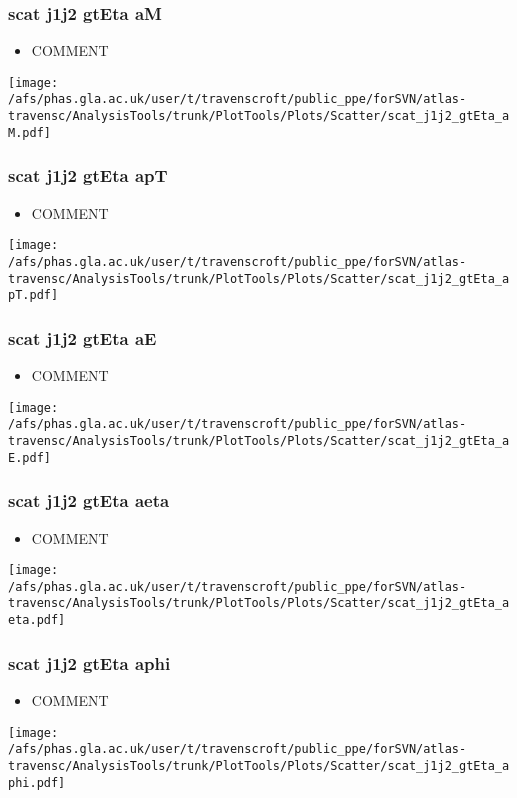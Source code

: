 \documentclass{beamer}
\begin{document}
\begin{frame}
\frametitle{scat j1j2 gtEta aM}
\begin{itemize}
\item COMMENT
\end{itemize}
\begin{center}
\texttt{[image: /afs/phas.gla.ac.uk/user/t/travenscroft/public\_ppe/forSVN/atlas-travensc/AnalysisTools/trunk/PlotTools/Plots/Scatter/scat\_j1j2\_gtEta\_aM.pdf]}
\end{center}
\end{frame}

\begin{frame}
\frametitle{scat j1j2 gtEta apT}
\begin{itemize}
\item COMMENT
\end{itemize}
\begin{center}
\texttt{[image: /afs/phas.gla.ac.uk/user/t/travenscroft/public\_ppe/forSVN/atlas-travensc/AnalysisTools/trunk/PlotTools/Plots/Scatter/scat\_j1j2\_gtEta\_apT.pdf]}
\end{center}
\end{frame}

\begin{frame}
\frametitle{scat j1j2 gtEta aE}
\begin{itemize}
\item COMMENT
\end{itemize}
\begin{center}
\texttt{[image: /afs/phas.gla.ac.uk/user/t/travenscroft/public\_ppe/forSVN/atlas-travensc/AnalysisTools/trunk/PlotTools/Plots/Scatter/scat\_j1j2\_gtEta\_aE.pdf]}
\end{center}
\end{frame}

\begin{frame}
\frametitle{scat j1j2 gtEta aeta}
\begin{itemize}
\item COMMENT
\end{itemize}
\begin{center}
\texttt{[image: /afs/phas.gla.ac.uk/user/t/travenscroft/public\_ppe/forSVN/atlas-travensc/AnalysisTools/trunk/PlotTools/Plots/Scatter/scat\_j1j2\_gtEta\_aeta.pdf]}
\end{center}
\end{frame}

\begin{frame}
\frametitle{scat j1j2 gtEta aphi}
\begin{itemize}
\item COMMENT
\end{itemize}
\begin{center}
\texttt{[image: /afs/phas.gla.ac.uk/user/t/travenscroft/public\_ppe/forSVN/atlas-travensc/AnalysisTools/trunk/PlotTools/Plots/Scatter/scat\_j1j2\_gtEta\_aphi.pdf]}
\end{center}
\end{frame}
\end{document}

